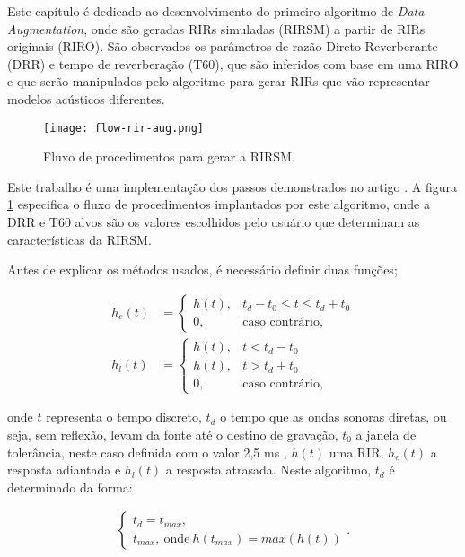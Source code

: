 Este capítulo é dedicado ao desenvolvimento do primeiro algoritmo de \textit{Data Augmentation}, onde são geradas RIRs simuladas (RIRSM)
a partir de RIRs originais (RIRO). São observados os parâmetros de razão Direto-Reverberante (DRR) e tempo de reverberação (T60), que são
inferidos com base em uma RIRO e que serão manipulados pelo algoritmo para gerar RIRs que vão representar modelos acústicos diferentes.

\begin{figure} [H]
    \centering
    \texttt{[image: flow-rir-aug.png]}
    \caption{Fluxo de procedimentos para gerar a RIRSM.}
    \label{fig:flow-rir-aug}
\end{figure}

Este trabalho é uma implementação dos passos demonstrados no artigo \cite{RIR_Data_Aug}. A figura \ref{fig:flow-rir-aug} especifica 
o fluxo de procedimentos implantados por este algoritmo, onde a DRR e T60 alvos são os valores escolhidos pelo usuário que determinam
as características da RIRSM. 

Antes de explicar os métodos usados, é necessário definir duas funções; 

\begin{align} 
    h_e(t) &= 
    \begin{cases} \label{eqn:rir-early}
        h(t), & t_d-t_0 \le t \le t_d+t_0 \\
        0, & \text{caso contrário,}
    \end{cases} \\
    h_l(t) &= 
    \begin{cases} \label{eqn:rir-late}
        h(t), & t < t_d - t_0 \\
        h(t), & t > t_d + t_0 \\
        0, & \text{caso contrário,}
    \end{cases}
\end{align}

\noindent
onde $t$ representa o tempo discreto, $t_d$ o tempo que as ondas sonoras diretas, ou seja, sem reflexão, levam da fonte até o destino de gravação,
$t_0$ a janela de tolerância, neste caso definida com o valor 2,5 ms \cite{RIR_Data_Aug}, 
$h(t)$ uma RIR, $h_e(t)$ a resposta adiantada e $h_l(t)$ a resposta atrasada.
Neste algoritmo, $t_d$ é determinado da forma:

\begin{align} \label{eqn:t_d}
    \begin{cases}
        t_d = t_{max},\\
        t_{max}, \ \text{onde} \ h(t_{max}) = max(h(t))
    \end{cases}
    .
\end{align}


